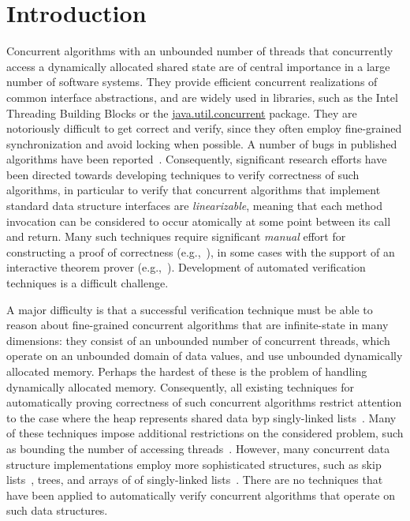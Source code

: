 \section{Introduction}



Concurrent algorithms with an unbounded number of
threads that concurrently access a dynamically allocated shared state
are of central importance in a large number of software systems.
They provide efficient concurrent realizations of
common interface abstractions, and
are widely used in libraries,
such as the Intel Threading Building Blocks or
the \url{java.util.concurrent} package.
They are notoriously difficult to get correct and verify, since they
often employ fine-grained synchronization and avoid locking when
possible. A number of bugs  in published
algorithms have been reported~\cite{DDGJLMMSS:dcas,MiSc:correction}.
Consequently, significant research efforts have been directed towards developing
techniques to verify correctness of such algorithms, in particular
to verify that concurrent algorithms that implement standard data structure
interfaces are {\em linearizable}, meaning that
each method invocation can be considered to occur atomically at some point
between its call and return.
Many such techniques require significant {\em manual} effort for
constructing a proof of correctness
(e.g.,~\cite{LF:pldi13,Vafeiadis:Thesis}),
in some cases with the support of an interactive theorem prover
(e.g.,~\cite{Aaron:logical:linearizability,Colvin:Lazy-List,Derrick:fm14,SWD:cav12,SDW:tcl14}).
Development of automated verification techniques is a difficult challenge.

A major difficulty is that a successful verification technique must be
able to reason about fine-grained concurrent algorithms that are infinite-state
in many dimensions: 
they consist of an unbounded number of concurrent threads, which
operate on an unbounded domain of data values, and use
unbounded dynamically allocated memory. 
Perhaps the hardest of these is the problem of handling
dynamically allocated memory.
Consequently, all existing techniques for automatically proving correctness
of such concurrent algorithms restrict attention to the case where
the heap represents shared data byp singly-linked
lists~\cite{AHHR:integrated,meyer:vmcai16,Quy:sas16,Sagiv:correlation,Vafeiadis:cav10}. Many of these techniques impose additional restrictions on the considered problem, such as bounding the number of accessing
threads~\cite{Amit:comparisonAbstraction,Vechev:spin09,CernyRZCA:CAV10}.
However, many concurrent data structure implementations employ more
sophisticated structures, such as skip
lists~\cite{Fomitchev:2004,ArtOfMpP,Sundell:2005}, trees, and arrays of
of singly-linked lists~\cite{ts-stack}.  There are no
techniques that have been applied to automatically verify concurrent algorithms
that operate on such data structures.


